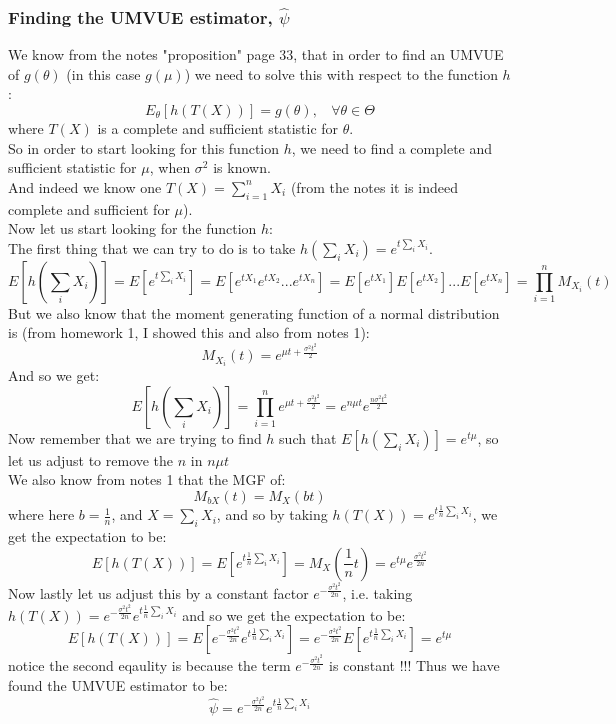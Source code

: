 \documentclass[12pt]{article}
\begin{document}
\subsubsection*{Finding the UMVUE estimator, $\hat{\psi}$}
We know from the notes "proposition" page 33, that in order to find an UMVUE of $g(\theta)$ (in this case $g(\mu)$) we need to solve this with respect to the function $h$: 
\[
E_\theta[h(T(X))] = g(\theta), \ \ \ \ \forall \theta \in \Theta
\]
where $T(X)$ is a complete and sufficient statistic for $\theta$.\\
So in order to start looking for this function $h$, we need to find a complete and sufficient statistic for $\mu$, when $\sigma^2$ is known.\\
And indeed we know one $T(X) = \sum_{i=1}^{n} X_i$ (from the notes it is indeed complete and sufficient for $\mu$).\\
Now let us start looking for the function $h$:\\ 
The first thing that we can try to do is to take $h(\sum_{i} X_i) = e^{t\sum_i X_i}$. \\ 
\[
E[h(\sum_{i} X_i)] = E[e^{t\sum_i X_i}] = E[e^{tX_1}e^{tX_2}...e^{tX_n}] = E[e^{tX_1}]E[e^{tX_2}]...E[e^{tX_n}] = \prod_{i=1}^{n}M_{X_i}(t)  
\]
But we also know that the moment generating function of a normal distribution is (from homework 1, I showed this and also from notes 1):
\[
M_{X_i}(t) = e^{\mu t + \frac{\sigma^2t^2}{2}}
\]
And so we get:
\[
E[h(\sum_{i} X_i)] = \prod_{i=1}^{n}e^{\mu t + \frac{\sigma^2t^2}{2}} = e^{n\mu t } e^{\frac{n\sigma^2t^2}{2}}
\]
Now remember that we are trying to find $h$ such that $E[h(\sum_{i} X_i)] = e^{t\mu}$, so let us adjust to remove the $n$ in $n\mu t$\\
We also know from notes 1 that the MGF of:
\[
M_{bX}(t) = M_X(bt)
\]
where here $b=\frac{1}{n}$, and $X = \sum_i X_i$, and so by taking $h(T(X)) = e^{t\frac{1}{n}\sum_iX_i}$, we get the expectation to be:
\[
E[h(T(X))] = E[e^{t\frac{1}{n}\sum_iX_i}] = M_X(\frac{1}{n}t) =e^{t\mu} e^{\frac{\sigma^2t^2}{2n}}
\]
Now lastly let us adjust this by a constant factor $e^{-\frac{\sigma^2 t^2}{2n}}$, i.e. taking $h(T(X)) = e^{-\frac{\sigma^2 t^2}{2n}}e^{t\frac{1}{n}\sum_iX_i}$ and so we get the expectation to be: 
\[
E[h(T(X))] = E[e^{-\frac{\sigma^2 t^2}{2n}}e^{t\frac{1}{n}\sum_iX_i}] = e^{-\frac{\sigma^2 t^2}{2n}}E[e^{t\frac{1}{n}\sum_iX_i}] = e^{t\mu}
\]
notice the second eqaulity is because the term $e^{-\frac{\sigma^2 t^2}{2n}}$ is constant !!!
Thus we have found the UMVUE estimator to be:
\[
\hat{\psi} = e^{-\frac{\sigma^2 t^2}{2n}}e^{t\frac{1}{n}\sum_iX_i}
\]
\end{document}
